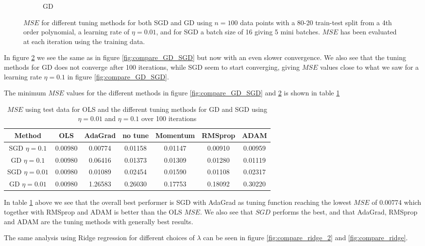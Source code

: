 \documentclass[11pt]{article}
\begin{document}
\begin{figure}[H]
\begin{subfigure}{.5\textwidth}
    \caption{GD}
    \label{fig:}
  \end{subfigure}
  \caption{$MSE$ for different tuning methods for both SGD and GD using $n=100$ data points with a 80-20 train-test split from a 4th order polynomial, a learning rate of $\eta=0.01$, and for SGD a batch size of 16 giving 5 mini batches. $MSE$ has been evaluated at each iteration using the training data.}
  \label{fig:compare_GD_SGD_2}
\end{figure}
In figure \ref{fig:compare_GD_SGD_2} we see the same as in figure \ref{fig:compare_GD_SGD} but now with an even slower convergence. We also see that the tuning methods for GD does not converge after 100 iterations, while SGD seem to start converging, giving $MSE$ values close to what we saw for a learning rate $\eta =0.1$ in figure \ref{fig:compare_GD_SGD}.

The minimum $MSE$ values for the different methods in figure \ref{fig:compare_GD_SGD} and \ref{fig:compare_GD_SGD_2} is shown in table \ref{tab:OLS_compare}
\begin{table}[H]
  \centering
  \caption{$MSE$ using test data for OLS and the different tuning methods for GD and SGD using  $\eta=0.01$ and $\eta=0.1$ over 100 iterations}
  \label{tab:OLS_compare}
  \begin{tabular}{|c|c|c|c|c|c|c|}
    \hline
    Method          & OLS     & AdaGrad & no tune & Momentum & RMSprop & ADAM    \\
    \hline
    SGD $\eta=0.1$  & 0.00980 & 0.00774 & 0.01158 & 0.01147  & 0.00910 & 0.00959 \\
    \hline
    GD  $\eta=0.1$  & 0.00980 & 0.06416 & 0.01373 & 0.01309  & 0.01280 & 0.01119 \\
    \hline
    SGD $\eta=0.01$ & 0.00980 & 0.01089 & 0.02454 & 0.01590  & 0.01108 & 0.02317 \\
    \hline
    GD  $\eta=0.01$ & 0.00980 & 1.26583 & 0.26030 & 0.17753  & 0.18092 & 0.30220 \\
    \hline
  \end{tabular}
\end{table}
In table \ref{tab:OLS_compare} above we see that the overall best performer is SGD with AdaGrad as tuning function reaching the lowest $MSE$ of 0.00774 which together with RMSprop and ADAM is better than the OLS $MSE$. We also see that $SGD$ performs the best, and that AdaGrad, RMSprop and ADAM are the tuning methods with generally best results.

The same analysis using Ridge regression for different choices of $\lambda$ can be seen in figure  \ref{fig:compare_ridge_2} and \ref{fig:compare_ridge}.
\end{document}
